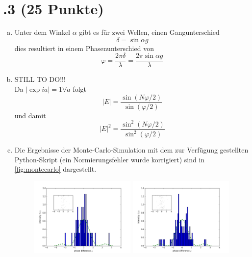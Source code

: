 \section*{\nr.3 \titthree (25 Punkte)}
\begin{enumerate}[(a)]
\item Unter dem Winkel $\alpha$ gibt es für zwei Wellen, einen Gangunterschied 
\begin{equation}
  \delta = \sin \alpha g
\end{equation}
dies resultiert in einem Phasenunterschied von
\begin{equation}
  \varphi = \frac{2 \pi \delta}{\lambda}=\frac{2 \pi \sin \alpha g}{\lambda}
\end{equation}
\item STILL TO DO!!!\\
Da $|\exp i a| = 1 \forall a$ folgt 
\begin{equation}
  |E|=\frac{\sin\left(N \varphi/2\right)}{\sin\left(\varphi/2\right)}
\end{equation}
und damit
\begin{equation}
  |E|^2=\frac{\sin^2\left(N \varphi/2\right)}{\sin^2\left(\varphi/2\right)}
\end{equation}
\item Die Ergebnisse der Monte-Carlo-Simulation mit dem zur Verfügung gestellten Python-Skript (ein Normierungsfehler wurde korrigiert) sind in \vref{fig:montecarlo} dargestellt.
\begin{figure}[htbp]
\centering
\includegraphics[width=0.49\textwidth]{50.png}
\includegraphics[width=0.49\textwidth]{100.png}

\end{figure}
\end{enumerate}
